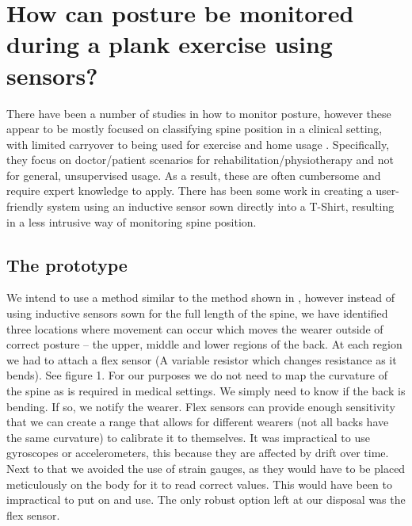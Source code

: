 \documentclass[sigconf]{acmart}
\begin{document}
\section{How can posture be monitored during a plank exercise using sensors?}

There have been a number of studies in how to monitor posture, however these appear to be mostly focused on classifying spine position in a clinical setting, with limited carryover to being used for exercise and home usage  \cite{wong2008detecting, voinea2016measurement, wong2008smart} . Specifically, they focus on doctor/patient scenarios for rehabilitation/physiotherapy and not for general, unsupervised usage. As a result, these are often cumbersome and require expert knowledge to apply. There has been some work in creating a user{-}friendly system \cite{sardini2015wireless} using an inductive sensor sown directly into a T{-}Shirt, resulting in a less intrusive way of monitoring spine position.   

\subsection{The prototype}

We intend to use a method similar to the method shown in \cite{sardini2015wireless}, however instead of using inductive sensors sown for the full length of the spine, we have identified three locations where movement can occur which moves the wearer outside of correct posture – the upper, middle and lower regions of the back. At each region we had to attach a flex sensor (A variable resistor which changes resistance as it bends). See figure 1.  For our purposes we do not need to map the curvature of the spine as is required in medical settings. We simply need to know if the back is bending. If so, we notify the wearer. Flex sensors can provide enough sensitivity that we can create a range that allows for different wearers (not all backs have the same curvature) to calibrate it to themselves. It was impractical to use gyroscopes or accelerometers, this because they are affected by drift over time. \cite{papi2017wearable}  Next to that we avoided the use of strain gauges, as they would have to be placed meticulously on the body for it to read correct values. \cite{papi2017wearable} This would have been to impractical to put on and use. The only robust option left at our disposal was the flex sensor.
\end{document}
